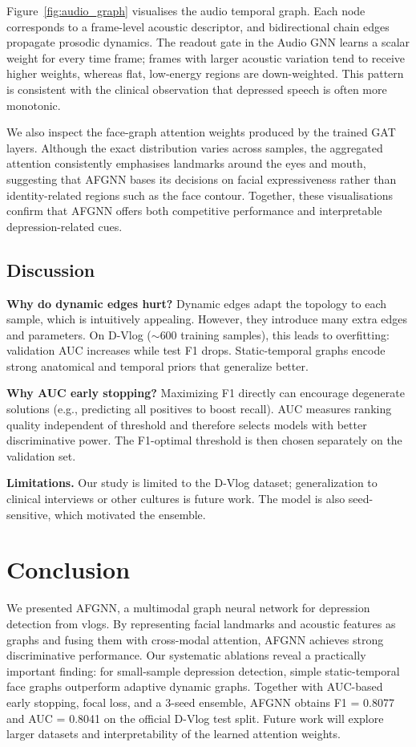 \documentclass[conference]{IEEEtran}
\begin{document}
Figure~\ref{fig:audio_graph} visualises the audio temporal graph.
Each node corresponds to a frame-level acoustic descriptor, and bidirectional chain edges propagate prosodic dynamics.
The readout gate in the Audio GNN learns a scalar weight for every time frame; frames with larger acoustic variation tend to receive higher weights, whereas flat, low-energy regions are down-weighted.
This pattern is consistent with the clinical observation that depressed speech is often more monotonic.

We also inspect the face-graph attention weights produced by the trained GAT layers.
Although the exact distribution varies across samples, the aggregated attention consistently emphasises landmarks around the eyes and mouth, suggesting that AFGNN bases its decisions on facial expressiveness rather than identity-related regions such as the face contour.
Together, these visualisations confirm that AFGNN offers both competitive performance and interpretable depression-related cues.

\subsection{Discussion}

\textbf{Why do dynamic edges hurt?}
Dynamic edges adapt the topology to each sample, which is intuitively appealing.
However, they introduce many extra edges and parameters.
On D-Vlog ($\sim$600 training samples), this leads to overfitting: validation AUC increases while test F1 drops.
Static-temporal graphs encode strong anatomical and temporal priors that generalize better.

\textbf{Why AUC early stopping?}
Maximizing F1 directly can encourage degenerate solutions (e.g., predicting all positives to boost recall).
AUC measures ranking quality independent of threshold and therefore selects models with better discriminative power.
The F1-optimal threshold is then chosen separately on the validation set.

\textbf{Limitations.}
Our study is limited to the D-Vlog dataset; generalization to clinical interviews or other cultures is future work.
The model is also seed-sensitive, which motivated the ensemble.

\section{Conclusion}
\label{sec:conclusion}

We presented AFGNN, a multimodal graph neural network for depression detection from vlogs.
By representing facial landmarks and acoustic features as graphs and fusing them with cross-modal attention, AFGNN achieves strong discriminative performance.
Our systematic ablations reveal a practically important finding: for small-sample depression detection, simple static-temporal face graphs outperform adaptive dynamic graphs.
Together with AUC-based early stopping, focal loss, and a 3-seed ensemble, AFGNN obtains F1 = 0.8077 and AUC = 0.8041 on the official D-Vlog test split.
Future work will explore larger datasets and interpretability of the learned attention weights.
\end{document}
